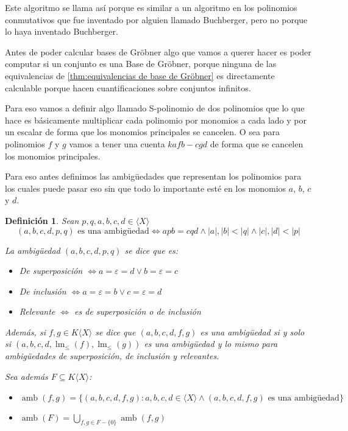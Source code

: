 \documentclass{report}
\theoremstyle{customstyle}
\newtheorem{definition}{Definición}[chapter]
\theoremstyle{factstyle}
\DeclareMathOperator{\lm}{lm}
\DeclareMathOperator{\amb}{amb}
\begin{document}
Este algoritmo se llama así porque es similar a un algoritmo en los polinomios conmutativos que fue inventado por alguien llamado Buchberger, pero no porque lo haya inventado Buchberger.

Antes de poder calcular bases de Gröbner algo que vamos a querer hacer es poder computar si un conjunto es una Base de Gröbner, porque ninguna de las equivalencias de \cref{thm:equivalencias de base de Gröbner} es directamente calculable porque hacen cuantificaciones sobre conjuntos infinitos.

Para eso vamos a definir algo llamado S-polinomio de dos polinomios que lo que hace es básicamente multiplicar cada polinomio por monomios a cada lado y por un escalar de forma que los monomios principales se cancelen. O sea para polinomios $f$ y $g$ vamos a tener una cuenta $k a f b - c g d$ de forma que se cancelen los monomios principales.

Para eso antes definimos las ambigüedades que representan los polinomios para los cuales puede pasar eso sin que todo lo importante esté en los monomios $a$, $b$, $c$ y $d$.

\begin{definition}
  Sean $p, q, a, b, c, d ∈ ⟨X⟩$
  \[ (a, b, c, d, p, q)\text{ es una ambigüedad} ⇔ apb = cqd ∧ |a|, |b| < |q| ∧ |c|, |d| < |p| \]

  La ambigüedad $(a, b, c, d, p, q)$ se dice que es:
  \begin{itemize}
    \item De superposición $⇔ a = ε = d ∨ b = ε = c$
    \item De inclusión $⇔ a = ε = b ∨ c = ε = d$
    \item Relevante $⇔$ es de superposición o de inclusión
  \end{itemize}

  Además, si $f, g ∈ K⟨X⟩$ se dice que $(a, b, c, d, f, g)$ es una ambigüedad si y solo si $(a, b, c, d, \lm_≤{(f)}, \lm_≤{(g)})$ es una ambigüedad y lo mismo para ambigüedades de superposición, de inclusión y relevantes.

  Sea además $F ⊆ K⟨X⟩$:
  \begin{itemize}
    \item $\amb(f, g) = \{(a, b, c, d, f, g) : a, b, c, d ∈ ⟨X⟩ ∧ (a, b, c, d, f, g)\text{ es una ambigüedad}\}$
    \item $\amb(F) = ⋃_{f, g ∈ F - \{0\}}{\amb(f, g)}$
  \end{itemize}

\end{definition}
\end{document}

